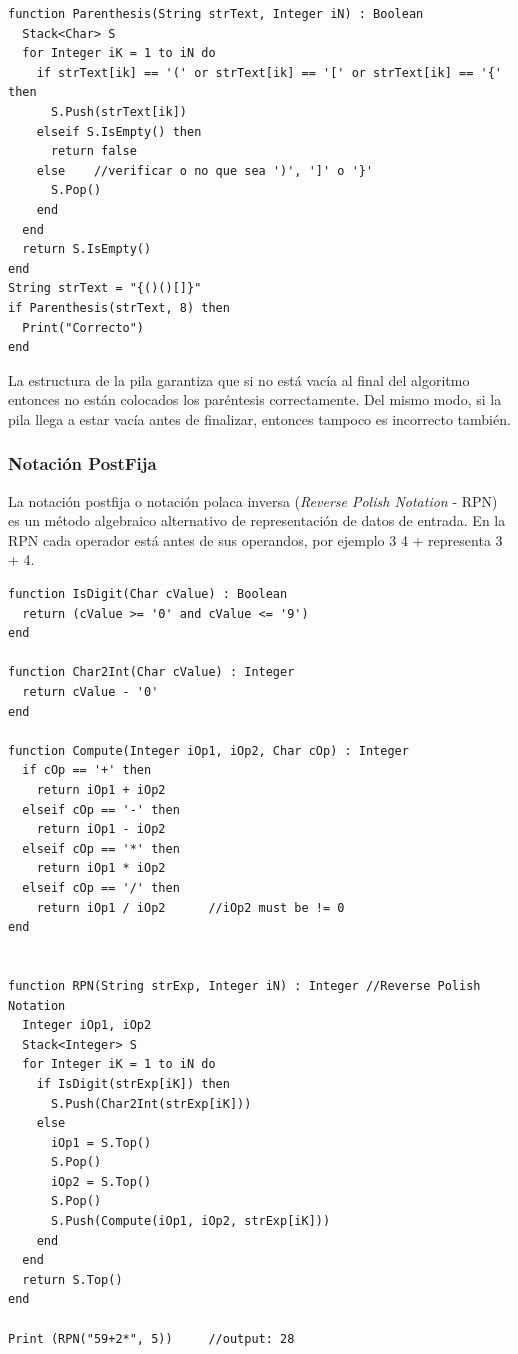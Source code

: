 \begin{lstlisting}[upquote=true, language=pseudo]
function Parenthesis(String strText, Integer iN) : Boolean
  Stack<Char> S
  for Integer iK = 1 to iN do
    if strText[ik] == '(' or strText[ik] == '[' or strText[ik] == '{' then
      S.Push(strText[ik])
    elseif S.IsEmpty() then
      return false
    else 	//verificar o no que sea ')', ']' o '}'
      S.Pop()
    end
  end
  return S.IsEmpty()
end
String strText = "{()()[]}"
if Parenthesis(strText, 8) then
  Print("Correcto")
end
\end{lstlisting}

La estructura de la pila garantiza que si no está vacía al final del algoritmo entonces no están colocados los paréntesis correctamente. Del mismo modo, si la pila llega a estar vacía antes de finalizar, entonces tampoco es incorrecto también.

\subsubsection{Notación PostFija}

La notación postfija o notación polaca inversa (\textit{Reverse Polish Notation} - RPN) es un método algebraico alternativo de representación de datos de entrada. En la RPN cada operador está antes de sus operandos, por ejemplo 3 4 + representa 3 + 4.

\begin{lstlisting}[upquote=true, language=pseudo]
function IsDigit(Char cValue) : Boolean
  return (cValue >= '0' and cValue <= '9')
end

function Char2Int(Char cValue) : Integer
  return cValue - '0'
end

function Compute(Integer iOp1, iOp2, Char cOp) : Integer
  if cOp == '+' then
    return iOp1 + iOp2
  elseif cOp == '-' then
    return iOp1 - iOp2
  elseif cOp == '*' then
    return iOp1 * iOp2
  elseif cOp == '/' then
    return iOp1 / iOp2		//iOp2 must be != 0
end


function RPN(String strExp, Integer iN) : Integer //Reverse Polish Notation
  Integer iOp1, iOp2
  Stack<Integer> S
  for Integer iK = 1 to iN do
    if IsDigit(strExp[iK]) then
      S.Push(Char2Int(strExp[iK]))
    else
      iOp1 = S.Top()
      S.Pop()
      iOp2 = S.Top()
      S.Pop()
      S.Push(Compute(iOp1, iOp2, strExp[iK]))
    end
  end
  return S.Top()
end

Print (RPN("59+2*", 5))		//output: 28
\end{lstlisting}


